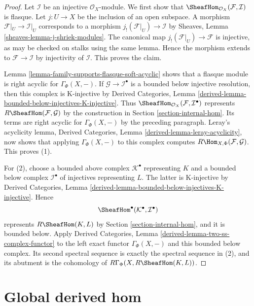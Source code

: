 \begin{proof}
Let $\mathcal{I}$ be an injective $\mathcal{O}_X$-module. We first show
that $\SheafHom_{\mathcal{O}_X}(\mathcal{F}, \mathcal{I})$ is flasque.
Let $j : U \to X$ be the inclusion of an open subspace. A morphism
$\mathcal{F}|_U \to \mathcal{I}|_U$ corresponds to a morphism
$j_!(\mathcal{F}|_U) \to \mathcal{I}$ by
Sheaves, Lemma \ref{sheaves-lemma-j-shriek-modules}. The canonical map
$j_!(\mathcal{F}|_U) \to \mathcal{F}$ is injective, as may be checked on
stalks using the same lemma. Hence the morphism extends to
$\mathcal{F} \to \mathcal{I}$ by injectivity of $\mathcal{I}$. This proves
the claim.

Lemma \ref{lemma-family-supports-flasque-soft-acyclic} shows that a
flasque module is right acyclic for $\Gamma_\Phi(X, -)$. If
$\mathcal{G} \to \mathcal{I}^\bullet$ is a bounded below injective
resolution, then this complex is K-injective by
Derived Categories, Lemma
\ref{derived-lemma-bounded-below-injectives-K-injective}. Thus
$\SheafHom_{\mathcal{O}_X}(\mathcal{F}, \mathcal{I}^\bullet)$ represents
$R\SheafHom(\mathcal{F}, \mathcal{G})$ by the construction in
Section \ref{section-internal-hom}. Its terms are right acyclic for
$\Gamma_\Phi(X, -)$ by the preceding paragraph. Leray's acyclicity lemma,
Derived Categories, Lemma \ref{derived-lemma-leray-acyclicity}, now shows
that applying $\Gamma_\Phi(X, -)$ to this complex computes
$R\Hom_{X, \Phi}(\mathcal{F}, \mathcal{G})$. This proves (1).

For (2), choose a bounded above complex $\mathcal{K}^\bullet$
representing $K$ and a bounded below complex $\mathcal{I}^\bullet$ of
injectives representing $L$. The latter is K-injective by
Derived Categories, Lemma
\ref{derived-lemma-bounded-below-injectives-K-injective}. Hence
$$
\SheafHom^\bullet(\mathcal{K}^\bullet, \mathcal{I}^\bullet)
$$
represents $R\SheafHom(K, L)$ by
Section \ref{section-internal-hom}, and it is bounded below. Apply
Derived Categories, Lemma \ref{derived-lemma-two-ss-complex-functor} to
the left exact functor $\Gamma_\Phi(X, -)$ and this bounded below complex.
Its second spectral sequence is exactly the spectral sequence in (2),
and its abutment is the cohomology of
$R\Gamma_\Phi(X, R\SheafHom(K, L))$.
\end{proof}





\section{Global derived hom}
\label{section-global-RHom}

